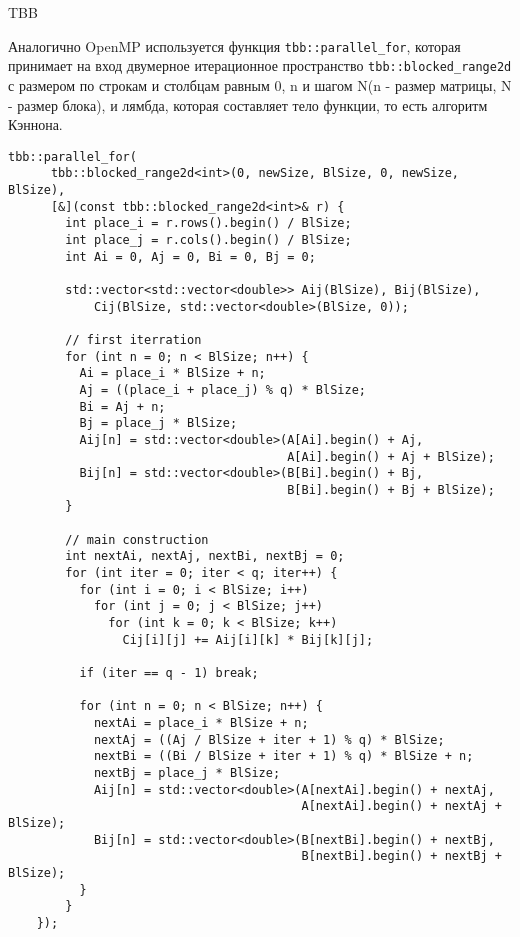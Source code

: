 \documentclass{report}
\begin{document}
\par TBB
\par Аналогично OpenMP используется функция \verb|tbb::parallel_for|, которая принимает на вход двумерное итерационное пространство \verb|tbb::blocked_range2d| с размером по строкам и столбцам равным 0, n и шагом N(n - размер матрицы, N - размер блока), и лямбда, которая составляет тело функции, то есть алгоритм Кэннона.
\begin{lstlisting}
tbb::parallel_for(
      tbb::blocked_range2d<int>(0, newSize, BlSize, 0, newSize, BlSize),
      [&](const tbb::blocked_range2d<int>& r) {
        int place_i = r.rows().begin() / BlSize;
        int place_j = r.cols().begin() / BlSize;
        int Ai = 0, Aj = 0, Bi = 0, Bj = 0;

        std::vector<std::vector<double>> Aij(BlSize), Bij(BlSize),
            Cij(BlSize, std::vector<double>(BlSize, 0));

        // first iterration
        for (int n = 0; n < BlSize; n++) {
          Ai = place_i * BlSize + n;
          Aj = ((place_i + place_j) % q) * BlSize;
          Bi = Aj + n;
          Bj = place_j * BlSize;
          Aij[n] = std::vector<double>(A[Ai].begin() + Aj,
                                       A[Ai].begin() + Aj + BlSize);
          Bij[n] = std::vector<double>(B[Bi].begin() + Bj,
                                       B[Bi].begin() + Bj + BlSize);
        }

        // main construction
        int nextAi, nextAj, nextBi, nextBj = 0;
        for (int iter = 0; iter < q; iter++) {
          for (int i = 0; i < BlSize; i++)
            for (int j = 0; j < BlSize; j++)
              for (int k = 0; k < BlSize; k++)
                Cij[i][j] += Aij[i][k] * Bij[k][j];

          if (iter == q - 1) break;

          for (int n = 0; n < BlSize; n++) {
            nextAi = place_i * BlSize + n;
            nextAj = ((Aj / BlSize + iter + 1) % q) * BlSize;
            nextBi = ((Bi / BlSize + iter + 1) % q) * BlSize + n;
            nextBj = place_j * BlSize;
            Aij[n] = std::vector<double>(A[nextAi].begin() + nextAj,
                                         A[nextAi].begin() + nextAj + BlSize);
            Bij[n] = std::vector<double>(B[nextBi].begin() + nextBj,
                                         B[nextBi].begin() + nextBj + BlSize);
          }
        }
    });
  
\end{lstlisting}
\end{document}
